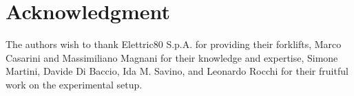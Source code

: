 \documentclass[journal, onecolumn, 12pt]{styles/IEEEtran}
\begin{document}
\section*{Acknowledgment}

The authors wish to thank Elettric80 S.p.A. for providing their forklifts, Marco Casarini and Massimiliano Magnani for their knowledge and expertise, Simone Martini, Davide Di Baccio, Ida M. Savino, and Leonardo Rocchi for their fruitful work on the experimental setup. %






\end{document}
